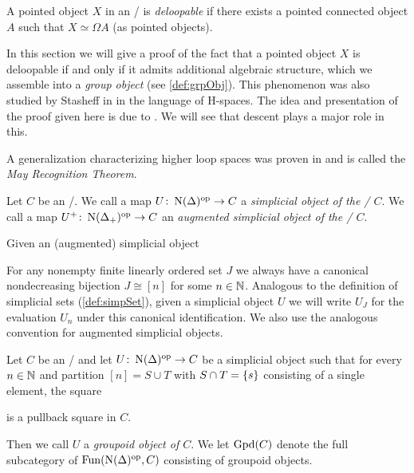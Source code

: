 A pointed object $X$ in an \inftytop/ is \emph{deloopable} if there exists a pointed connected object $A$ such that $X\simeq\Omega A$ (as pointed objects).

In this section we will give a proof of the fact that a pointed object $X$ is deloopable if and only if it admits additional algebraic structure, which we assemble into a \emph{group object} (see \cref{def:grpObj}).
This phenomenon was also studied by Stasheff in \cite{stasheff_hspaces} in the language of H-spaces.
The idea and presentation of the proof given here is due to \cite{segal_cat_and_cohom}.
We will see that descent plays a major role in this.

A generalization characterizing higher loop spaces was proven in \cite{may2006geometry} and is called the \emph{May Recognition Theorem}.
\begin{definition}
    Let $C$ be an \inftycat/. 
    We call a map $U\colon\operatorname{N}(\Delta)^{\operatorname{op}}\to C$ a \emph{simplicial object of the \inftycat/ $C$}.
    We call a map $U^+\colon\operatorname{N}(\Delta_+)^{\operatorname{op}}\to C$ an \emph{augmented simplicial object of the \inftycat/ $C$}.
    
    Given an (augmented) simplicial object 

    For any nonempty finite linearly ordered set $J$ we always have a canonical nondecreasing bijection $J\cong[n]$ for some $n\in\mathbb{N}$.
    Analogous to the definition of simplicial sets (\cref{def:simpSet}), given a simplicial object $U$ we will write $U_J$ for the evaluation $U_n$ under this canonical identification. 
    We also use the analogous convention for augmented simplicial objects.
\end{definition}
\begin{definition}
    Let $C$ be an \inftycat/ and let $U\colon\operatorname{N}(\Delta)^{\operatorname{op}}\to C$ be a simplicial object such that for every $n\in\mathbb{N}$ and partition $[n]=S\cup T$ with $S\cap T=\left\lbrace s\right\rbrace$ consisting of a single element, the square 
    \begin{center}
    \end{center}
    is a pullback square in $C$.

    Then we call $U$ a \emph{groupoid object of $C$}.
    We let $\operatorname{Gpd}(C)$ denote the full subcategory of $\operatorname{Fun}(\operatorname{N}(\Delta)^{\operatorname{op}},C)$ consisting of groupoid objects.
\end{definition}
